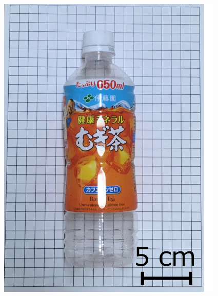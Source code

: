 \begin{figure}[H]
\begin{minipage}{0.19\columnwidth}
        \includegraphics[clip, width=\linewidth]{figure/chapter4/bottle_650ml}
    \end{minipage}
    \begin{minipage}{0.19\columnwidth}
        \centering

\end{minipage}
\end{figure}
